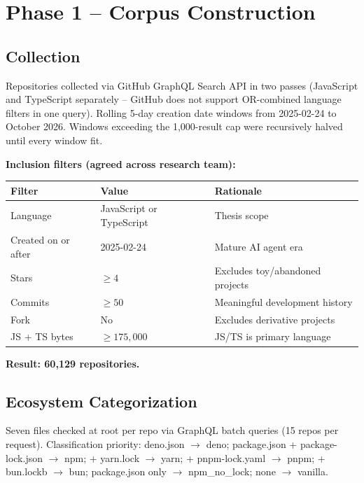 \documentclass[12pt,a4paper]{article}
\begin{document}
\section{Phase 1 -- Corpus Construction}

\subsection{Collection}

Repositories collected via GitHub GraphQL Search API in two passes (JavaScript and
TypeScript separately -- GitHub does not support OR-combined language filters in one
query). Rolling 5-day creation date windows from 2025-02-24 to October 2026. Windows
exceeding the 1,000-result cap were recursively halved until every window fit.

\medskip
\noindent\textbf{Inclusion filters (agreed across research team):}

\begin{table}[h]
\centering
\begin{tabular}{@{}lll@{}}
\toprule
Filter & Value & Rationale \\
\midrule
Language            & JavaScript or TypeScript & Thesis scope \\
Created on or after & 2025-02-24               & Mature AI agent era \\
Stars               & $\geq 4$                 & Excludes toy/abandoned projects \\
Commits             & $\geq 50$                & Meaningful development history \\
Fork                & No                       & Excludes derivative projects \\
JS + TS bytes       & $\geq 175{,}000$         & JS/TS is primary language \\
\bottomrule
\end{tabular}
\end{table}

\noindent\textbf{Result: 60,129 repositories.}

\subsection{Ecosystem Categorization}

Seven files checked at root per repo via GraphQL batch queries (15 repos per request).
Classification priority: deno.json $\to$ deno; package.json + package-lock.json $\to$ npm;
+ yarn.lock $\to$ yarn; + pnpm-lock.yaml $\to$ pnpm; + bun.lockb $\to$ bun;
package.json only $\to$ npm\_no\_lock; none $\to$ vanilla.
\end{document}
